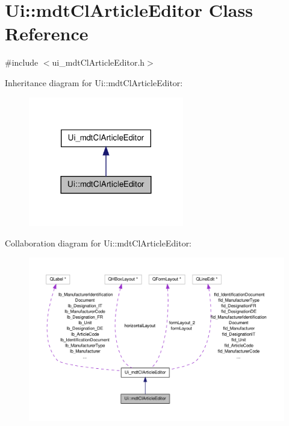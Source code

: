 \hypertarget{class_ui_1_1mdt_cl_article_editor}{\section{Ui\-:\-:mdt\-Cl\-Article\-Editor Class Reference}
\label{class_ui_1_1mdt_cl_article_editor}
}


{\ttfamily \#include $<$ui\-\_\-mdt\-Cl\-Article\-Editor.\-h$>$}



Inheritance diagram for Ui\-:\-:mdt\-Cl\-Article\-Editor\-:\nopagebreak
\begin{figure}[H]
\begin{center}
\leavevmode
\includegraphics[width=192pt]{class_ui_1_1mdt_cl_article_editor__inherit__graph}
\end{center}
\end{figure}


Collaboration diagram for Ui\-:\-:mdt\-Cl\-Article\-Editor\-:\nopagebreak
\begin{figure}[H]
\begin{center}
\leavevmode
\includegraphics[width=350pt]{class_ui_1_1mdt_cl_article_editor__coll__graph}
\end{center}
\end{figure}
